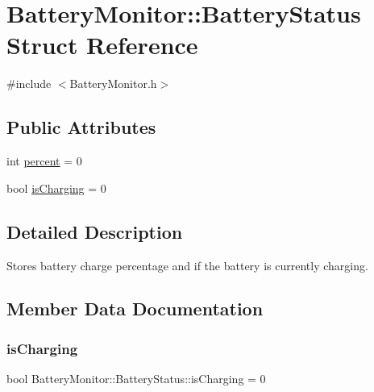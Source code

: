 \hypertarget{structBatteryMonitor_1_1BatteryStatus}{}\section{Battery\+Monitor\+:\+:Battery\+Status Struct Reference}
\label{structBatteryMonitor_1_1BatteryStatus}


{\ttfamily \#include $<$Battery\+Monitor.\+h$>$}

\subsection*{Public Attributes}
\begin{DoxyCompactItemize}
\item 
int \mbox{\hyperlink{structBatteryMonitor_1_1BatteryStatus_a96b2c9af693268f594dae2236f51e095}{percent}} = 0
\item 
bool \mbox{\hyperlink{structBatteryMonitor_1_1BatteryStatus_a0cff642372ab66c5cd3f961a59c32fd9}{is\+Charging}} = 0
\end{DoxyCompactItemize}


\subsection{Detailed Description}
Stores battery charge percentage and if the battery is currently charging. 

\subsection{Member Data Documentation}
\mbox{\label{structBatteryMonitor_1_1BatteryStatus_a0cff642372ab66c5cd3f961a59c32fd9}} 
\subsubsection{\texorpdfstring{is\+Charging}{isCharging}}
{\footnotesize\ttfamily bool Battery\+Monitor\+::\+Battery\+Status\+::is\+Charging = 0}

\mbox{\label{structBatteryMonitor_1_1BatteryStatus_a96b2c9af693268f594dae2236f51e095}} 
